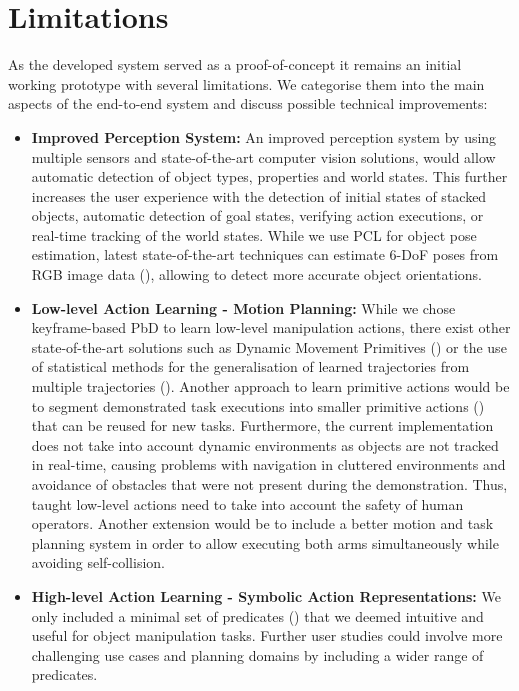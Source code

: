 \section{Limitations}
As the developed system served as a proof-of-concept it remains an initial working prototype with several limitations.
We categorise them into the main aspects of the end-to-end system and discuss possible technical improvements:
\begin{itemize}
	\item 
{	\textbf{{Improved Perception System: }}
	An improved perception system by using multiple sensors and state-of-the-art computer vision solutions, would allow automatic detection of object types, properties and world states. This further increases the user experience with the detection of initial states of stacked objects, automatic detection of goal states, verifying action executions, or real-time tracking of the world states.
	While we use PCL for object pose estimation, latest state-of-the-art techniques can estimate 6-DoF poses from RGB image data (\cite{tremblay2018deep}), allowing to detect more accurate object orientations.}
\item {
	\textbf{{Low-level Action Learning - Motion Planning:}}
	While we chose keyframe-based PbD to learn low-level manipulation actions, there exist other state-of-the-art solutions such as Dynamic Movement Primitives (\cite{pastor2009learning}) or the use of statistical methods for the generalisation of learned trajectories from multiple trajectories (\cite{billard2008robot}).
	Another approach to learn primitive actions would be to segment demonstrated task executions into smaller primitive actions (\cite{kuniyoshi1994learning,wu2010hierarchical}) that can be reused for new tasks.
	Furthermore, the current implementation does not take into account dynamic environments as objects are not tracked in real-time, causing problems with navigation in cluttered environments and avoidance of obstacles that were not present during the demonstration.
	Thus, taught low-level actions need to take into account the safety of human operators.
	Another extension would be to include a better motion and task planning system in order to allow executing both arms simultaneously while avoiding self-collision.
}
\item {
	\textbf{High-level Action Learning - Symbolic Action Representations:}
	We only included a minimal set of predicates () that we deemed intuitive and useful for object manipulation tasks.
	Further user studies could involve more challenging use cases and planning domains by including a wider range of predicates.
}
\end{itemize}
